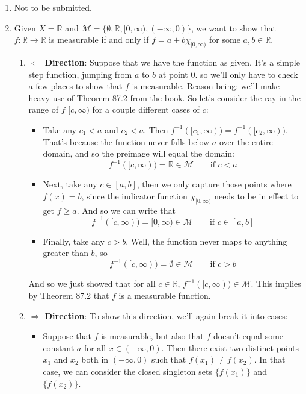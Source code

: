 \documentclass[12pt]{article}
\theoremstyle{plain}
\theoremstyle{definition}
\theoremstyle{remark}
\begin{document}
\begin{enumerate}
\item Not to be submitted.


\item Given $X=\mathbb{R}$ and $\mathscr{M} = \{\emptyset, \mathbb{R}, [0,\infty), (-\infty,0)\}$, we want to show that $f:\mathbb{R}\rightarrow\mathbb{R}$ is measurable if and only if $f=a+b\chi_{[0,\infty)}$ for some $a,b\in\mathbb{R}$. 
    
\begin{enumerate}
    \item \textbf{$\Leftarrow$ Direction}: Suppose that we have the function as given.  It's a simple step function, jumping from $a$ to $b$ at point $0$. so we'll only have to check a few places to show that $f$ is measurable. Reason being: we'll make heavy use of Theorem 87.2 from the book. So let's consider the ray in the range of $f$ $[c,\infty)$ for a couple different cases of $c$:
\begin{itemize}
\item Take any $c_1<a$ and $c_2<a$. Then $f^{-1}([c_1,\infty)) =f^{-1}([c_2,\infty))$. That's because the function never falls below $a$ over the entire domain, and so the preimage will equal the domain:
\[
    f^{-1}([c,\infty)) = \mathbb{R}\in\mathscr{M} \qquad 
        \text{if $c<a$}
\]
\item Next, take any $c \in [a,b]$, then we only capture those points where $f(x)=b$, since the indicator function $\chi_{[0,\infty)}$ needs to be in effect to get $f\geq a$. And so we can write that
\[
    f^{-1}([c,\infty)) = [0,\infty)\in\mathscr{M} \qquad 
        \text{if $c\in[a,b]$}
\]
\item Finally, take any $c >b$. Well, the function never maps to anything greater than $b$, so
\[
    f^{-1}([c,\infty)) = \emptyset\in\mathscr{M} \qquad 
        \text{if $c>b$}
\]
\end{itemize}
And so we just showed that for all $c\in\mathbb{R}$, $f^{-1}([c,\infty))\in\mathscr{M}$. This implies by Theorem 87.2 that $f$ is a measurable function.

\item \textbf{$\Rightarrow$ Direction}: To show this direction, we'll again break it into cases:
\begin{itemize}
    \item Suppose that $f$ is measurable, but also that $f$ doesn't equal some constant $a$ for all $x\in(-\infty,0)$. Then there exist two distinct points $x_1$ and $x_2$ both in $(-\infty,0)$ such that $f(x_1)\neq f(x_2)$. In that case, we can consider the closed singleton sets $\{f(x_1)\}$ and $\{f(x_2)\}$. 


\end{itemize}
\end{enumerate}
\end{enumerate}
\end{document}
